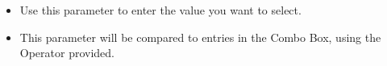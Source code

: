 \begin{itemize}
\item Use this parameter to enter the value you want to select. 
\item This parameter will be compared to entries in the Combo Box, using the Operator provided.
\end{itemize}
